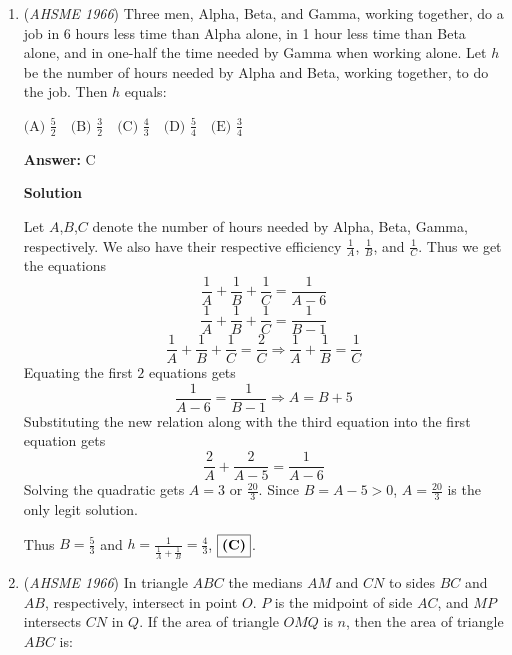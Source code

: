 \begin{enumerate}
 $\text{(A) } 2^n \quad \text{(B) } 2^n+1 \quad \text{(C) } \frac{3^n-1}{2} \quad \text{(D) } \frac{3^n}{2} \quad \text{(E) } \frac{3^n+1}{2}$

 \textbf{Answer: }E



\textbf{Solution 1}

Let $f(x)=(1+x+x^2)^n$ then we have 
 \[f(1)=a_0+a_1+a_2+...+a_{2n}=(1+1+1)^n=3^n\]
 \[f(-1)=a_0-a_1+a_2-...+a_{2n}=(1-1+1)^n=1\]Adding yields
 \[f(1)+f(-1)=2(a_0+a_2+a_4+...+a_{2n})=3^n+1\]Thus $s=\frac{3^n+1}{2}$, or $\fbox{\textbf{(E)}}$.

 


	\item (\textit{AHSME 1966}) Three men, Alpha, Beta, and Gamma, working together, do a job in 6 hours less time than Alpha alone, in 1 hour less time than Beta alone, and in one-half the time needed by Gamma when working alone. Let $h$ be the number of hours needed by Alpha and Beta, working together, to do the job. Then $h$ equals:


 $\text{(A) } \frac{5}{2} \quad \text{(B) } \frac{3}{2} \quad \text{(C) } \frac{4}{3} \quad \text{(D) } \frac{5}{4} \quad \text{(E) } \frac{3}{4}$

 \textbf{Answer: }C



\textbf{Solution}

Let $A$,$B$,$C$ denote the number of hours needed by Alpha, Beta, Gamma, respectively. We also have their respective efficiency $\frac{1}{A}$, $\frac{1}{B}$, and $\frac{1}{C}$. Thus we get the equations
 \[\frac{1}{A}+\frac{1}{B}+\frac{1}{C}=\frac{1}{A-6}\]
 \[\frac{1}{A}+\frac{1}{B}+\frac{1}{C}=\frac{1}{B-1}\]
 \[\frac{1}{A}+\frac{1}{B}+\frac{1}{C}=\frac{2}{C}\Longrightarrow \frac{1}{A}+\frac{1}{B}=\frac{1}{C}\]Equating the first $2$ equations gets 
 \[\frac{1}{A-6}=\frac{1}{B-1}\Longrightarrow A=B+5\]Substituting the new relation along with the third equation into the first equation gets
 \[\frac{2}{A}+\frac{2}{A-5}=\frac{1}{A-6}\]Solving the quadratic gets $A=3$ or $\frac{20}{3}$. Since $B=A-5>0$, $A=\frac{20}{3}$ is the only legit solution.

 Thus $B=\frac{5}{3}$ and $h=\frac{1}{\frac{1}{A}+\frac{1}{B}}=\frac{4}{3}$, $\fbox{\textbf{(C)}}$.

 


	\item (\textit{AHSME 1966}) In triangle $ABC$ the medians $AM$ and $CN$ to sides $BC$ and $AB$, respectively, intersect in point $O$. $P$ is the midpoint of side $AC$, and $MP$ intersects $CN$ in $Q$. If the area of triangle $OMQ$ is $n$, then the area of triangle $ABC$ is:



\end{enumerate}
